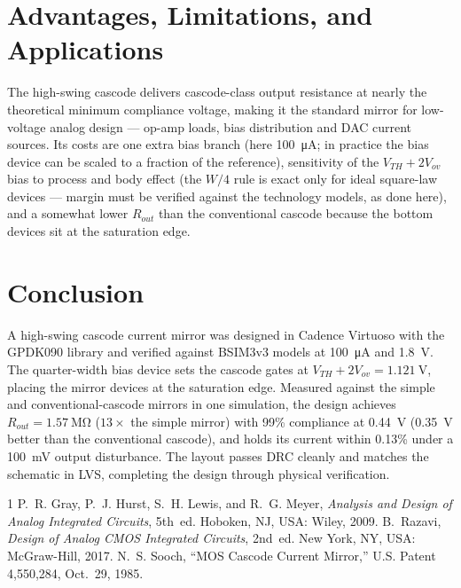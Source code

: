 \documentclass[conference]{IEEEtran}
\begin{document}
\section{Advantages, Limitations, and Applications}
The high-swing cascode delivers cascode-class output resistance at nearly the
theoretical minimum compliance voltage, making it the standard mirror for
low-voltage analog design --- op-amp loads, bias distribution and DAC current
sources. Its costs are one extra bias branch (here \SI{100}{\micro\ampere};
in practice the bias device can be scaled to a fraction of the reference),
sensitivity of the $V_{TH}+2V_{ov}$ bias to process and body effect (the
$W/4$ rule is exact only for ideal square-law devices --- margin must be
verified against the technology models, as done here), and a somewhat lower
$R_{out}$ than the conventional cascode because the bottom devices sit at the
saturation edge.

\section{Conclusion}
A high-swing cascode current mirror was designed in Cadence Virtuoso with the
GPDK090 library and verified against BSIM3v3 models at \SI{100}{\micro\ampere}
and \SI{1.8}{\volt}. The quarter-width bias device sets the cascode gates at
$V_{TH}+2V_{ov}=\SI{1.121}{\volt}$, placing the mirror devices at the
saturation edge. Measured against the simple and conventional-cascode mirrors
in one simulation, the design achieves $R_{out}=\SI{1.57}{\mega\ohm}$
($13\times$ the simple mirror) with 99\% compliance at \SI{0.44}{\volt}
(\SI{0.35}{\volt} better than the conventional cascode), and holds its
current within 0.13\% under a \SI{100}{\milli\volt} output disturbance. The
layout passes DRC cleanly and matches the schematic in LVS, completing the
design through physical verification.

\begin{thebibliography}{1}
P.~R. Gray, P.~J. Hurst, S.~H. Lewis, and R.~G. Meyer, \emph{Analysis and
Design of Analog Integrated Circuits}, 5th~ed. Hoboken, NJ, USA: Wiley, 2009.
B.~Razavi, \emph{Design of Analog CMOS Integrated Circuits}, 2nd~ed. New
York, NY, USA: McGraw-Hill, 2017.
N.~S. Sooch, ``MOS Cascode Current Mirror,'' U.S. Patent 4,550,284,
Oct.~29, 1985.
\end{thebibliography}
\end{document}
